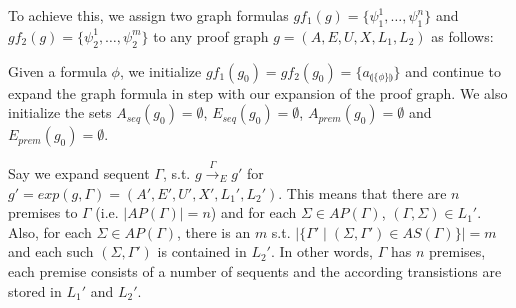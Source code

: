 \documentclass{llncs}
\newcommand{\ind}[1]{\llparenthesis #1 \rrparenthesis}
\begin{document}
To achieve this, we assign two graph formulas $gf_1(g)=\{\psi_1^1,\ldots,\psi_1^n\}$ and 
$gf_2(g)=\{\psi_2^1,\ldots,\psi_2^m\}$ to any proof graph $g=(A,E,U,X,L_1,L_2)$ as follows:

Given a formula $\phi$, we initialize $gf_1(g_0)=gf_2(g_0)=\{a_{\ind{\{\phi\}}}\}$ and continue to expand the graph formula
in step with our expansion of the proof graph. We also initialize the sets $A_{seq}(g_0)=\emptyset$, $E_{seq}(g_0)=\emptyset$,
$A_{prem}(g_0)=\emptyset$ and $E_{prem}(g_0)=\emptyset$.

Say we expand sequent $\Gamma$, s.t. $g\stackrel{\Gamma}\rightarrow_E g'$ for $g'=exp(g,\Gamma)=(A',E',U',X',L_1',L_2')$.
This means that there are $n$ premises to $\Gamma$ (i.e. $|AP(\Gamma)|=n$) and for each $\Sigma \in AP(\Gamma)$,
$(\Gamma,\Sigma)\in L_1'$. Also, for each $\Sigma \in AP(\Gamma)$, there is an $m$ s.t.
$|\{\Gamma'\mid (\Sigma,\Gamma')\in AS(\Gamma)\}|=m$ and each such $(\Sigma,\Gamma')$ is contained in $L_2'$.
In other words, $\Gamma$ has $n$ premises, each premise consists of a number of sequents and the according
transistions are stored in $L_1'$ and $L_2'$.
\end{document}
